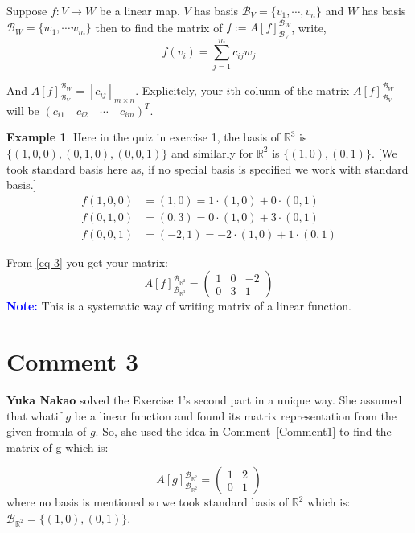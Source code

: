 \documentclass{article}
\theoremstyle{definition}
\newtheorem{example}{Example}[section]
\begin{document}
Suppose $f:V\to W$ be a linear map. $V$ has basis $\mathcal{B}_V=\{v_1,\cdots, v_n\}$ and $W$ has basis $\mathcal{B}_W=\{w_1,\cdots w_m\}$ then to find the matrix of $f:= A[f]_{\mathcal{B}_V}^{\mathcal{B}_W}$, write,
\begin{equation}
    f(v_i)=\sum_{j=1}^{m}c_{ij}w_j
\end{equation}

And $A[f]_{\mathcal{B}_V}^{\mathcal{B}_W}=[c_{ij}]_{m\times n}$. Explicitely, your $i$th column of the matrix $A[f]_{\mathcal{B}_V}^{\mathcal{B}_W}$ will be $(c_{i1}\quad c_{i2} \quad \cdots \quad c_{im})^T$.

\begin{example}
    Here in the quiz in exercise 1, the basis of $\mathbb{R}^3$ is $\{(1,0,0),(0,1,0),(0,0,1)\}$ and similarly for $\mathbb{R}^2$ is $\{(1,0),(0,1)\}$. [We took standard basis here as, if no special basis is specified we work with standard basis.]
    \begin{equation}\label{eq-3}
        \begin{aligned}
            f(1,0,0) &= (1,0) = 1\cdot(1,0)+0\cdot(0,1) \\
            f(0,1,0) &= (0,3)=0\cdot(1,0)+3\cdot(0,1) \\
            f(0,0,1) &= (-2,1)=-2\cdot(1,0)+1\cdot(0,1)
        \end{aligned}
    \end{equation}

    From \eqref{eq-3} you get your matrix:
    \[
        A[f]_{\mathcal{B}_{\mathbb{R}^3}}^{\mathcal{B}_{\mathbb{R}^2}}=
        \begin{pmatrix}
            1 & 0 & -2 \\
            0 & 3 & 1
        \end{pmatrix}
    \]
\textcolor{blue}{\textbf{Note:}} This is a systematic way of writing matrix of a linear function.
\end{example}

\section{Comment 3}
\textbf{Yuka Nakao} solved the Exercise 1's second part in a unique way. She assumed that whatif $g$ be a linear function and found its matrix representation from the given fromula of $g$. So, she used the idea in \hyperref[Comment1]{Comment~\ref*{Comment1}} to find the matrix of g which is:

$$
A[g]_{\mathcal{B}_{\mathbb{R}^2}}^{\mathcal{B}_{\mathbb{R}^2}}=
\begin{pmatrix}
    1&2\\
    0&1
\end{pmatrix}
$$
where no basis is mentioned so we took standard basis of $\mathbb{R}^2$ which is: $\mathcal{B}_{\mathbb{R}^2}=\{(1,0),(0,1)\}$.
\end{document}
